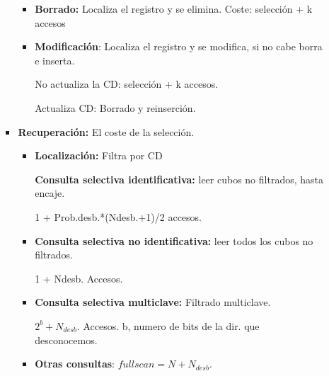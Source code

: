 \documentclass[12pt, twoside, openright]{report} %
\begin{document}
\begin{itemize}
\begin{itemize}
\begin{itemize}
\begin{itemize}
        \item \textbf{Borrado:} Localiza el registro y se elimina. Coste:
          selección + k accesos
          
        \item \textbf{Modificación}: Localiza el registro y se modifica, si
          no cabe borra e inserta.
          

         
		  
            No actualiza la CD: selección + k accesos.
           
			
            Actualiza CD: Borrado y reinserción.
          
			
        \end{itemize}
      \item \textbf{Recuperación:} El coste de la selección.
        

        \begin{itemize}
        \item \textbf{Localización:} Filtra por CD
          

         
		  
            \textbf{Consulta selectiva identificativa:} leer cubos no
            filtrados, hasta encaje.
            
			

            
			
              1 + Prob.desb.*(Ndesb.+1)/2 accesos.
             
			  
          \item
            
            \textbf{Consulta selectiva no identificativa:} leer todos
            los cubos no filtrados.
            

            
			
              1 + Ndesb. Accesos.
           
			  
          \item
            
            \textbf{Consulta selectiva multiclave:} Filtrado multiclave.
            

            
			
              $2^b+N_{desb}.$ Accesos. b, numero de bits de la dir. que
              desconocemos.
              
			  
          \item
            
            \textbf{Otras consultas}: $full scan= N + N_{desb}$.
            

\end{itemize}
\end{itemize}
\end{itemize}
\end{itemize}
\end{document}
